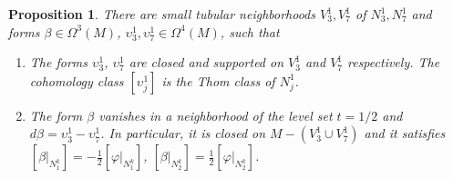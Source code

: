 \documentclass[10pt]{article}
\theoremstyle{plain}
\newtheorem{proposition}{Proposition}
\theoremstyle{definition}
\theoremstyle{remark}
\begin{document}
\begin{proposition}\label{prop:prim-M}
There are small tubular neighborhoods $V_3^1 ,V_7^1$ of $N_3^1, N_7^1$ and forms
 $\beta \in \Omega^3(M)$, $\upsilon_3^1, \upsilon_7^1 \in \Omega^4(M)$, 
such that
\begin{enumerate}
\item The forms $\upsilon_3^1$, $\upsilon_7^1$ are closed and supported on $V_3^1$ and $V_7^1$ respectively. The cohomology class $[\upsilon_j^1]$ is the Thom class of $N_j^1$.
\item The form $\beta$ vanishes in a neighborhood of the level set $t=1/2$ and $d\beta=\upsilon_3^1-\upsilon_7^1$. In particular, it is closed on $M-(V_3^1\cup V_7^1)$ and it satisfies
 $[\beta|_{N_1^k}]=-\frac{1}{2}[\varphi|_{N_1^k}]$,  $[\beta|_{N_2^k}]=\frac{1}{2}[\varphi|_{N_2^k}]$.
\end{enumerate}
\end{proposition}
\end{document}
